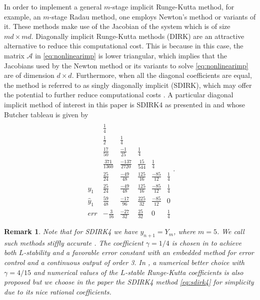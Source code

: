 \documentclass[10pt,a4paper]{article}
\newtheorem{remark}[theorem]{Remark}
\def \calA{\mathcal{A}}
\begin{document}
         In order to implement a general $m$-stage  implicit  Runge-Kutta method, for example, an $m$-stage Radau method, one employs Newton's method or variants of it. These methods make use of the Jacobian of the system which is of size $m d\times md$. Diagonally implicit Runge-Kutta methods (DIRK) are an attractive alternative to reduce this computational cost. This is because in this case, the matrix $\calA$ in \eqref{eq:nonlinearimp} is lower triangular, which implies that the Jacobians used by the Newton method or its variants to solve \eqref{eq:nonlinearimp} are of dimension $d\times d$. Furthermore, when all the diagonal coefficients are equal, the method is referred to as singly diagonally implicit (SDIRK), which may offer the potential to further reduce computational costs \cite{HaW96}. A particular diagonal implicit method of interest in this paper is SDIRK4 as presented in \cite[Table IV.6.5, p. 100]{HaW96} and whose Butcher tableau is given by
         \begin{equation}\label{eq:sdirk4}
\begin{array}
{c|ccccc}
\\
 & \frac14\\[1mm]
 &\frac12 &\frac14 \\[1mm]
& \frac{17}{50}& \frac{-1}{25}&\frac14 \\[1mm]
& \frac{371}{1360} &\frac{-137}{2720} &\frac{15}{544} &\frac14\\[1mm]
&\frac{25}{24} &\frac{-49}{48} &\frac{125}{16} &\frac{-85}{12} &\frac14\\[1mm]
\hline
y_1&\frac{25}{24} &\frac{-49}{48} &\frac{125}{16} &\frac{-85}{12} &\frac14\\[1mm]
\hat y_1&\frac{59}{48} &\frac{-17}{96} &\frac{225}{32} &\frac{-85}{12} &0\\[1mm]
err&-\frac{3}{16} &\frac{-27}{32} &\frac{25}{32} & 0 &\frac14
\end{array}.
\end{equation}
\begin{remark}%
Note that for SDIRK4 we have $y_{n+1}=Y_m$, where $m=5$. We call such methods stiffly accurate \cite{HaW96}. 
{The coefficient $\gamma=1/4$ is chosen in \cite[Sect.\thinspace IV.6, p. 99]{HaW96} to achieve both $L$-stability and a favorable error constant with an embedded method for error control and a continuous output of order 3. In \cite[Sect.\thinspace IV.6, p. 99]{HaW96}, a numerical better choice with $\gamma=4/15$ and numerical values of the $L$-stable Runge-Kutta coefficients is also proposed but we choose in the paper the SDIRK4 method \eqref{eq:sdirk4} for simplicity due to its nice rational coefficients.}
\end{remark}
\end{document}
